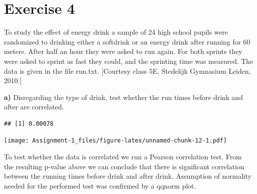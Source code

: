 \documentclass[
]{article}
\newenvironment{Shaded}{\begin{snugshade}}{\end{snugshade}}
\newcommand{\AttributeTok}[1]{\textcolor[rgb]{0.77,0.63,0.00}{#1}}
\newcommand{\ConstantTok}[1]{\textcolor[rgb]{0.00,0.00,0.00}{#1}}
\newcommand{\DecValTok}[1]{\textcolor[rgb]{0.00,0.00,0.81}{#1}}
\newcommand{\DocumentationTok}[1]{\textcolor[rgb]{0.56,0.35,0.01}{\textbf{\textit{#1}}}}
\newcommand{\FunctionTok}[1]{\textcolor[rgb]{0.00,0.00,0.00}{#1}}
\newcommand{\NormalTok}[1]{#1}
\newcommand{\OtherTok}[1]{\textcolor[rgb]{0.56,0.35,0.01}{#1}}
\newcommand{\SpecialCharTok}[1]{\textcolor[rgb]{0.00,0.00,0.00}{#1}}
\newcommand{\StringTok}[1]{\textcolor[rgb]{0.31,0.60,0.02}{#1}}
\begin{document}
\hypertarget{exercise-4}{%
\section{Exercise 4}\label{exercise-4}}

To study the effect of energy drink a sample of 24 high school pupils
were randomized to drinking either a softdrink or an energy drink after
running for 60 meters. After half an hour they were asked to run again.
For both sprints they were asked to sprint as fast they could, and the
sprinting time was measured. The data is given in the file run.txt.
{[}Courtesy class 5E, Stedelijk Gymnasium Leiden, 2010.{]}

\textbf{a)} Disregarding the type of drink, test whether the run times
before drink and after are correlated.

\begin{Shaded}
\end{Shaded}

\begin{verbatim}
## [1] 0.00078
\end{verbatim}

\begin{Shaded}
\end{Shaded}

\texttt{[image: Assignment-1\_files/figure-latex/unnamed-chunk-12-1.pdf]}

To test whether the data is correlated we run a Pearson correlation
test. From the resulting p-value above we can conclude that there is
significant correlation between the running times before drink and after
drink. Assumption of normality needed for the performed test was
confirmed by a qqnorm plot.
\end{document}
